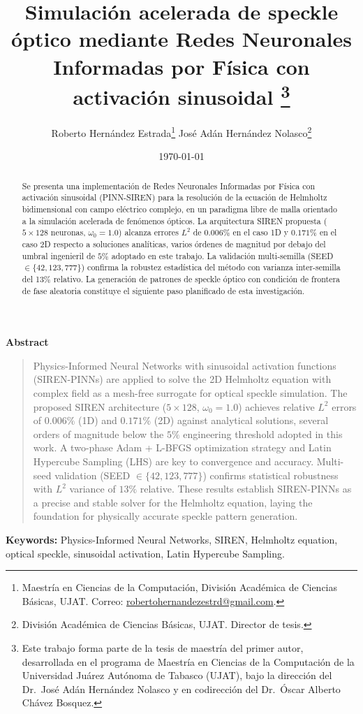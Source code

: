 \documentclass[12pt]{article}
\title{Simulación acelerada de speckle óptico mediante Redes
       Neuronales Informadas por Física con activación sinusoidal%
       \thanks{Este trabajo forma parte de la tesis de maestría del primer autor,
               desarrollada en el programa de Maestría en Ciencias de la Computación
               de la Universidad Juárez Autónoma de Tabasco (UJAT),
               bajo la dirección del Dr.\ José Adán Hernández Nolasco
               y en codirección del Dr.\ Óscar Alberto Chávez Bosquez.}}
\author{%
  Roberto Hernández Estrada\thanks{Maestría en Ciencias de la Computación,
    División Académica de Ciencias Básicas, UJAT.
    Correo: \href{mailto:robertohernandezestrd@gmail.com}{robertohernandezestrd@gmail.com}.} \quad
  José Adán Hernández Nolasco\thanks{División Académica de Ciencias Básicas, UJAT.
    Director de tesis.}
}
\date{\today}
\begin{document}

\maketitle
\thispagestyle{empty}

\begin{center}
  \textbf{Abstract}
\end{center}
\begin{quote}
\noindent\singlespacing
Physics-Informed Neural Networks with sinusoidal activation functions (SIREN-PINNs)
are applied to solve the 2D Helmholtz equation with complex field as a mesh-free
surrogate for optical speckle simulation.
The proposed SIREN architecture ($5 \times 128$, $\omega_0 = 1.0$) achieves relative
$L^2$ errors of $0.006\%$ (1D) and $0.171\%$ (2D) against analytical solutions,
several orders of magnitude below the $5\%$ engineering threshold adopted in this
work.
A two-phase Adam + L-BFGS optimization strategy and Latin Hypercube Sampling (LHS)
are key to convergence and accuracy.
Multi-seed validation (SEED $\in \{42, 123, 777\}$) confirms statistical robustness with
$L^2$ variance of $13\%$ relative.
These results establish SIREN-PINNs as a precise and stable solver for the Helmholtz
equation, laying the foundation for physically accurate speckle pattern generation.
\end{quote}

\vspace{0.8em}
\noindent \textbf{Keywords:} Physics-Informed Neural Networks, SIREN,
Helmholtz equation, optical speckle, sinusoidal activation, Latin Hypercube Sampling.

\vspace{1.2em}
\newpage
\begin{abstract}
\noindent\singlespacing
Se presenta una implementación de Redes Neuronales Informadas por Física con
activación sinusoidal (PINN-SIREN) para la resolución de la ecuación de Helmholtz
bidimensional con campo eléctrico complejo, en un paradigma libre de malla orientado
a la simulación acelerada de fenómenos ópticos.
La arquitectura SIREN propuesta ($5 \times 128$ neuronas, $\omega_0 = 1.0$)
alcanza errores $L^2$ de $0.006\%$ en el caso 1D y $0.171\%$ en el caso 2D
respecto a soluciones analíticas, varios órdenes de magnitud por debajo del
umbral ingenieril de $5\%$ adoptado en este trabajo.
La validación multi-semilla (SEED $\in \{42, 123, 777\}$) confirma la robustez
estadística del método con varianza inter-semilla del 13\% relativo.
La generación de patrones de speckle óptico con condición de frontera de fase
aleatoria constituye el siguiente paso planificado de esta investigación.
\end{abstract}
\end{document}

